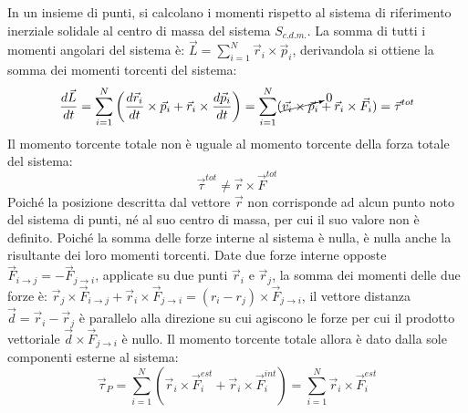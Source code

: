 \documentclass{article}
\numberwithin{equation}{subsection}
\begin{document}
In un insieme di punti, si calcolano i momenti rispetto 
al sistema di riferimento inerziale solidale al centro 
di massa del sistema $S_{c.d.m.}$. La somma 
di tutti i momenti angolari del sistema è: $\vec{L}=\displaystyle\sum_{i=1}^{N}\vec{r}_i\times\vec{p}_i$, 
derivandola si ottiene la somma dei momenti torcenti 
del sistema: 
\begin{equation}
    \displaystyle\frac{d\vec{L}}{dt}=\sum_{i=1}^{N}\left(\frac{d\vec{r}_i}{dt}\times\vec{p}_i+\vec{r}_i\times\frac{d\vec{p}_i}{dt}\right)=\sum_{i=1}^{N}(\cancelto{0}{\vec{v_i}\times\vec{p}_i}+\vec{r}_i\times\vec{F}_i)=\vec{\tau}^{tot}
\end{equation}
Il momento torcente totale non è uguale al momento torcente 
della forza totale del sistema: 
\begin{equation}
    \vec{\tau}^{tot}\neq\vec{r}\times\vec{F}^{tot}
\end{equation}
Poiché la posizione descritta dal vettore $\vec{r}$ non corrisponde ad alcun punto noto del sistema di punti, né al suo centro di massa, per cui il suo valore non è definito. 
Poiché la somma delle forze interne al sistema è nulla, è nulla anche la risultante dei loro momenti torcenti. Date due forze interne opposte 
$\vec{F}_{i\to j}=-\vec{F}_{j\to i}$, applicate su due punti 
$\vec{r}_i$ e $\vec{r}_j$, la somma dei momenti delle due forze 
è: $\vec{r}_j\times\vec{F}_{i\to j}+\vec{r}_i\times\vec{F}_{j\to i}=(r_i-r_j)\times\vec{F}_{j\to i}$, 
il vettore distanza $\vec{d}=\vec{r}_i-\vec{r}_j$ è parallelo 
alla direzione su cui agiscono le forze per cui il prodotto 
vettoriale $\vec{d}\times\vec{F}_{j\to i}$ è nullo. 
Il momento torcente totale allora è dato dalla sole componenti esterne al sistema:
\begin{equation}
    \vec{\tau}_P=\displaystyle\sum_{i=1}^{N}(\vec{r}_i\times\vec{F}^{est}_i+\vec{r}_i\times\vec{F}^{int}_i)=\sum_{i=1}^{N}\vec{r}_i\times\vec{F}^{est}_i
\end{equation}
\begin{center}\end{center}
\end{document}
